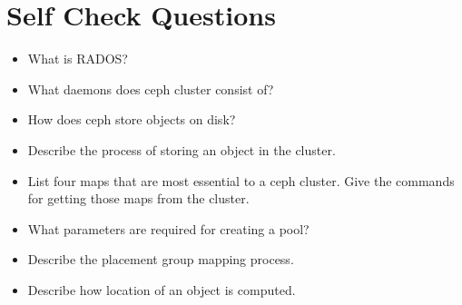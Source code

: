 \documentclass[12pt,a4paper]{report}
\begin{document}
\section{Self Check Questions}

\begin{itemize}
	\item What is RADOS?

	\item What daemons does ceph cluster consist of?

	\item How does ceph store objects on disk?

	\item Describe the process of storing an object in the cluster.

	\item List four maps that are most essential to a ceph cluster. Give
		the commands for getting those maps from the cluster.

	\item What parameters are required for creating a pool?

	\item Describe the placement group mapping process.

	\item Describe how location of an object is computed.
\end{itemize}
\end{document}
